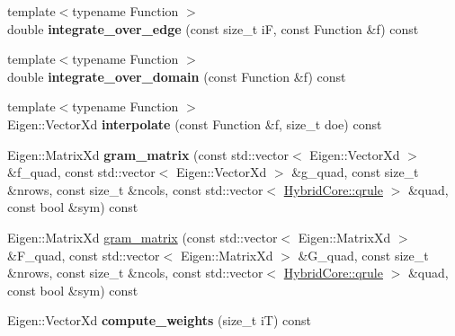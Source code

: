 \begin{DoxyCompactItemize}
\item 
\mbox{\label{classMeshFramework2D_1_1HybridCore_af2dcd1b81c27dff31f054ab1d4fcad2c}} 
{\footnotesize template$<$typename Function $>$ }\\double {\bfseries integrate\+\_\+over\+\_\+edge} (const size\+\_\+t iF, const Function \&f) const
\item 
\mbox{\label{classMeshFramework2D_1_1HybridCore_abc83b1c32e0950b80242850f6f75b682}} 
{\footnotesize template$<$typename Function $>$ }\\double {\bfseries integrate\+\_\+over\+\_\+domain} (const Function \&f) const
\item 
\mbox{\label{classMeshFramework2D_1_1HybridCore_a119bb20655eb4f9f50faef9571ac0529}} 
{\footnotesize template$<$typename Function $>$ }\\Eigen\+::\+Vector\+Xd {\bfseries interpolate} (const Function \&f, size\+\_\+t doe) const
\item 
\mbox{\label{classMeshFramework2D_1_1HybridCore_affed7f0bd7875c92ce8f258f1c45eaa3}} 
Eigen\+::\+Matrix\+Xd {\bfseries gram\+\_\+matrix} (const std\+::vector$<$ Eigen\+::\+Vector\+Xd $>$ \&f\+\_\+quad, const std\+::vector$<$ Eigen\+::\+Vector\+Xd $>$ \&g\+\_\+quad, const size\+\_\+t \&nrows, const size\+\_\+t \&ncols, const std\+::vector$<$ \hyperlink{structMeshFramework2D_1_1HybridCore_1_1qrule}{Hybrid\+Core\+::qrule} $>$ \&quad, const bool \&sym) const
\item 
Eigen\+::\+Matrix\+Xd \hyperlink{classMeshFramework2D_1_1HybridCore_a65c77d7e341d67b34662419db244705b}{gram\+\_\+matrix} (const std\+::vector$<$ Eigen\+::\+Matrix\+Xd $>$ \&F\+\_\+quad, const std\+::vector$<$ Eigen\+::\+Matrix\+Xd $>$ \&G\+\_\+quad, const size\+\_\+t \&nrows, const size\+\_\+t \&ncols, const std\+::vector$<$ \hyperlink{structMeshFramework2D_1_1HybridCore_1_1qrule}{Hybrid\+Core\+::qrule} $>$ \&quad, const bool \&sym) const
\item 
\mbox{\label{classMeshFramework2D_1_1HybridCore_ae77f5182b06c17e92cbd635379b553ae}} 
Eigen\+::\+Vector\+Xd {\bfseries compute\+\_\+weights} (size\+\_\+t iT) const
\item 
\mbox{\label{classMeshFramework2D_1_1HybridCore_a30be33160bb6dec597e54236607f4f3b}} 

\end{DoxyCompactItemize}

